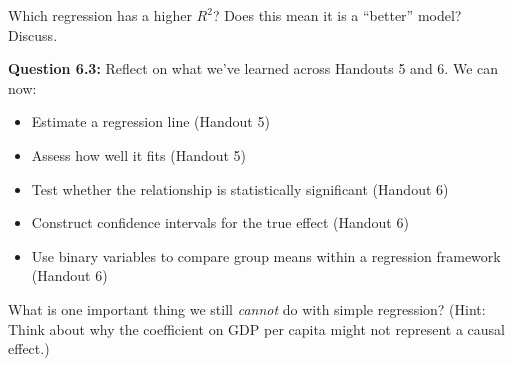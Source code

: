 \documentclass[11pt,letterpaper]{article}
\begin{document}
Which regression has a higher $R^2$? Does this mean it is a ``better'' model? Discuss.

\vspace{3cm}

\textbf{Question 6.3:} Reflect on what we've learned across Handouts 5 and 6. We can now:
\begin{itemize}
\item Estimate a regression line (Handout 5)
\item Assess how well it fits (Handout 5)
\item Test whether the relationship is statistically significant (Handout 6)
\item Construct confidence intervals for the true effect (Handout 6)
\item Use binary variables to compare group means within a regression framework (Handout 6)
\end{itemize}

What is one important thing we still \textit{cannot} do with simple regression? (Hint: Think about why the coefficient on GDP per capita might not represent a causal effect.)

\vspace{3cm}
\end{document}
